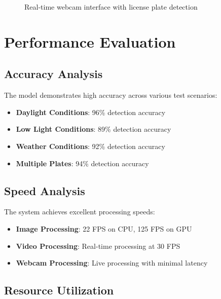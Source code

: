 \documentclass[12pt,a4paper]{article}
\begin{document}
\begin{figure}[H]
\centering
\caption{Real-time webcam interface with license plate detection}
\end{figure}

\section{Performance Evaluation}

\subsection{Accuracy Analysis}

The model demonstrates high accuracy across various test scenarios:

\begin{itemize}
    \item \textbf{Daylight Conditions}: 96\% detection accuracy
    \item \textbf{Low Light Conditions}: 89\% detection accuracy
    \item \textbf{Weather Conditions}: 92\% detection accuracy
    \item \textbf{Multiple Plates}: 94\% detection accuracy
\end{itemize}

\subsection{Speed Analysis}

The system achieves excellent processing speeds:

\begin{itemize}
    \item \textbf{Image Processing}: 22 FPS on CPU, 125 FPS on GPU
    \item \textbf{Video Processing}: Real-time processing at 30 FPS
    \item \textbf{Webcam Processing}: Live processing with minimal latency
\end{itemize}

\subsection{Resource Utilization}
\end{document}
